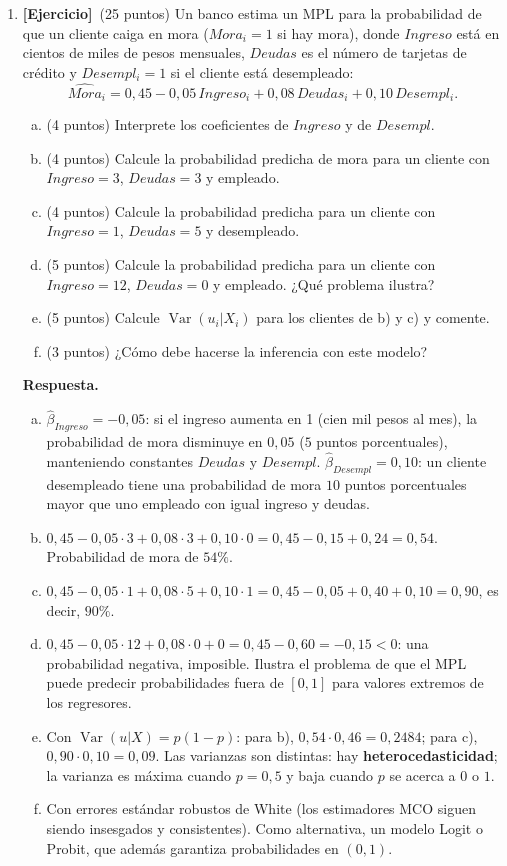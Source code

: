 \documentclass[12pt,letterpaper]{article}
\DeclareMathOperator{\var}{Var}
\newenvironment{resp}{\begingroup\color{blue}\par\noindent\textbf{Respuesta.}\ }{\par\endgroup}
\newcommand{\ejer}{\textbf{[Ejercicio]}}
\begin{document}
\begin{enumerate}[1.]
\item \ejer\ (25 puntos) Un banco estima un MPL para la probabilidad de que un cliente caiga en mora ($Mora_i=1$ si hay mora), donde $Ingreso$ está en cientos de miles de pesos mensuales, $Deudas$ es el número de tarjetas de crédito y $Desempl_i=1$ si el cliente está desempleado:
\[
\widehat{Mora}_i=0{,}45-0{,}05\,Ingreso_i+0{,}08\,Deudas_i+0{,}10\,Desempl_i .
\]
\begin{enumerate}[a)]
\item (4 puntos) Interprete los coeficientes de $Ingreso$ y de $Desempl$.
\item (4 puntos) Calcule la probabilidad predicha de mora para un cliente con $Ingreso=3$, $Deudas=3$ y empleado.
\item (4 puntos) Calcule la probabilidad predicha para un cliente con $Ingreso=1$, $Deudas=5$ y desempleado.
\item (5 puntos) Calcule la probabilidad predicha para un cliente con $Ingreso=12$, $Deudas=0$ y empleado. ¿Qué problema ilustra?
\item (5 puntos) Calcule $\var(u_i|X_i)$ para los clientes de b) y c) y comente.
\item (3 puntos) ¿Cómo debe hacerse la inferencia con este modelo?
\end{enumerate}

\begin{resp}
\begin{enumerate}[a)]
\item $\hat\beta_{Ingreso}=-0{,}05$: si el ingreso aumenta en 1 (cien mil pesos al mes), la probabilidad de mora disminuye en $0{,}05$ ($5$ puntos porcentuales), manteniendo constantes $Deudas$ y $Desempl$. $\hat\beta_{Desempl}=0{,}10$: un cliente desempleado tiene una probabilidad de mora $10$ puntos porcentuales mayor que uno empleado con igual ingreso y deudas.
\item $0{,}45-0{,}05\cdot3+0{,}08\cdot3+0{,}10\cdot0=0{,}45-0{,}15+0{,}24=0{,}54$. Probabilidad de mora de $54\%$.
\item $0{,}45-0{,}05\cdot1+0{,}08\cdot5+0{,}10\cdot1=0{,}45-0{,}05+0{,}40+0{,}10=0{,}90$, es decir, $90\%$.
\item $0{,}45-0{,}05\cdot12+0{,}08\cdot0+0=0{,}45-0{,}60=-0{,}15<0$: una probabilidad negativa, imposible. Ilustra el problema de que el MPL puede predecir probabilidades fuera de $[0,1]$ para valores extremos de los regresores.
\item Con $\var(u|X)=p(1-p)$: para b), $0{,}54\cdot0{,}46=0{,}2484$; para c), $0{,}90\cdot0{,}10=0{,}09$. Las varianzas son distintas: hay \textbf{heterocedasticidad}; la varianza es máxima cuando $p=0{,}5$ y baja cuando $p$ se acerca a $0$ o $1$.
\item Con errores estándar robustos de White (los estimadores MCO siguen siendo insesgados y consistentes). Como alternativa, un modelo Logit o Probit, que además garantiza probabilidades en $(0,1)$.
\end{enumerate}
\end{resp}
\end{enumerate}
\end{document}
